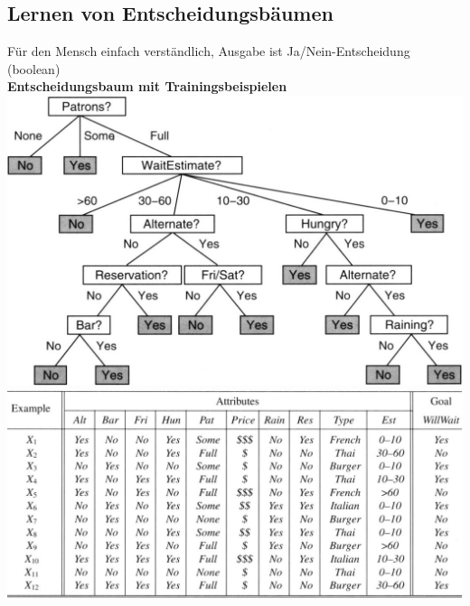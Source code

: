 \documentclass[12pt]{article}
\begin{document}
	\subsection{Lernen von Entscheidungsbäumen}
	Für den Mensch einfach verständlich, Ausgabe ist Ja/Nein-Entscheidung (boolean)\\
	\textbf{Entscheidungsbaum mit Trainingsbeispielen}\\
	\includegraphics[width=0.5\linewidth]{figures/entscheidungsbaum.JPG}
	\includegraphics[width=0.5\linewidth]{figures/entscheidungsbaum-trainingsbeispiele.JPG}
	
\end{document}

